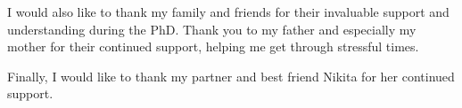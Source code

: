 I would also like to thank my family and friends for their invaluable support
and understanding during the PhD.  Thank you to my father and especially my mother for their continued
support, helping me get through stressful times.

Finally, I would like to thank my partner and best friend Nikita for her
continued support.

